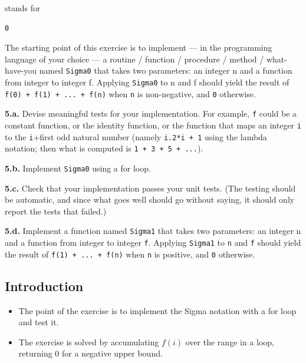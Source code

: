\documentclass[12pt]{article}
\begin{document}
stands for

\begin{verbatim}
0
\end{verbatim}

The starting point of this exercise is to implement --- in the programming
language of your choice --- a routine / function / procedure / method /
what-have-you named \texttt{Sigma0} that takes two parameters: an integer n and
a function from integer to integer f. Applying \texttt{Sigma0} to n and f should
yield the result of \texttt{f(0) + f(1) + ... + f(n)} when \texttt{n} is
non-negative, and \texttt{0} otherwise.

\textbf{5.a.} Devise meaningful tests for your implementation. For example,
\texttt{f} could be a constant function, or the identity function, or the
function that maps an integer \texttt{i} to the \texttt{i}+first odd natural
number (namely \texttt{i.2*i + 1} using the lambda notation; then what is
computed is \texttt{1 + 3 + 5 + ...}).

\textbf{5.b.} Implement \texttt{Sigma0} using a for loop.

\textbf{5.c.} Check that your implementation passes your unit tests. (The testing
should be automatic, and since what goes well should go without saying, it
should only report the tests that failed.)

\textbf{5.d.} Implement a function named \texttt{Sigma1} that takes two
parameters: an integer n and a function from integer to integer \texttt{f}.
Applying \texttt{Sigma1} to \texttt{n} and \texttt{f} should yield the result of
\texttt{f(1) + ... + f(n)} when \texttt{n} is positive, and \texttt{0} otherwise.


\subsection{Introduction}

\begin{itemize}

\item
  The point of the exercise is to implement the Sigma notation with a for loop and test it.

\item
  The exercise is solved by accumulating $f(i)$ over the range in a loop, returning 0 for a negative upper bound.

\end{itemize}

\end{document}
